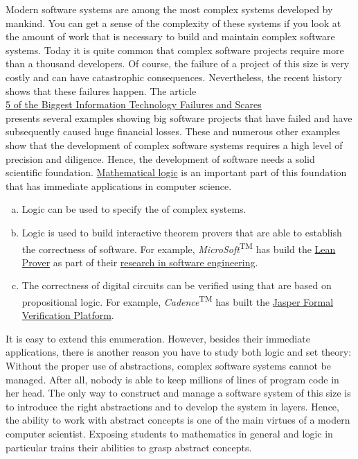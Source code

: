 Modern software systems are among the most complex systems developed by mankind.  You can get a
sense of the complexity of these systems if you look at the amount of work that is necessary to
build and maintain complex software systems.  Today it is quite common that complex software projects require
more than a thousand developers.  Of course, the failure of a project of this size is very costly and can have
catastrophic consequences.  Nevertheless, the recent history shows that these failures happen.  The article
\\[0.2cm]
\hspace*{0.8cm}
\href{https://www.exoplatform.com/blog/5-of-the-biggest-information-technology-failures-and-scares/}{5 of the Biggest Information Technology Failures and Scares} 
\\[0.2cm]
presents several examples showing big software projects that have failed and have subsequently caused huge
financial losses.  
These and numerous other examples show that the development of complex software systems requires a high level
of precision and diligence.  Hence, the development of software needs a solid scientific
foundation.  \href{https://en.wikipedia.org/wiki/Mathematical_logic}{Mathematical logic} 
is an important part of this foundation that has immediate applications in computer science. 
\begin{enumerate}[(a)]
\item Logic can be used to specify the  of complex systems.  
\item Logic is used to build interactive theorem provers that are able to establish the correctness of
      software.  For example, \textsl{MicroSoft}\textsuperscript{TM} has build the
      \href{https://leanprover.github.io}{Lean Prover} as part of their
      \href{https://www.microsoft.com/en-us/research/group/research-software-engineering-rise/}{research
      in software engineering}.
\item The correctness of digital circuits can be verified using  that are based on
      propositional logic.  For example, \textsl{Cadence}\textsuperscript{TM} has built the
      \href{https://www.cadence.com/en_US/home/tools/system-design-and-verification/formal-and-static-verification.html}{Jasper
        Formal Verification Platform}.
\end{enumerate}
It is easy to extend this enumeration.  However, besides their immediate applications, 
there is another reason you have to study both logic and set theory: Without the proper use of
{\color{blue}abstractions}, complex software systems cannot be managed.  After all, nobody is able to keep
millions of lines of program code in her head.  The only way to construct and manage a software system of this
size is to introduce the right abstractions and to develop the system in layers.  Hence, the ability
to work with abstract concepts is one of the main virtues of a modern computer scientist.  
Exposing students to mathematics in general and logic in particular trains their abilities to grasp abstract concepts.

